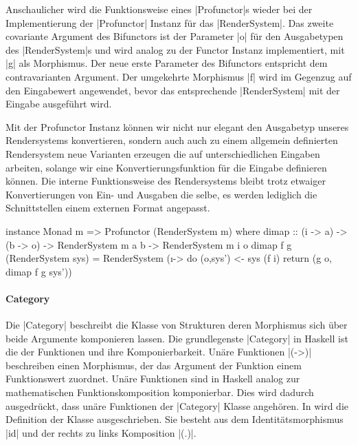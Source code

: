 Anschaulicher wird die Funktionsweise eines |Profunctor|s wieder bei der Implementierung der |Profunctor| Instanz für das |RenderSystem|. Das zweite covariante Argument des Bifunctors ist der Parameter |o| für den Ausgabetypen des |RenderSystem|s und wird analog zu der Functor Instanz implementiert, mit |g| als Morphismus. Der neue erste Parameter des Bifunctors entspricht dem contravarianten Argument. Der umgekehrte Morphismus |f| wird im Gegenzug auf den Eingabewert angewendet, bevor das entsprechende |RenderSystem| mit der Eingabe ausgeführt wird.

Mit der Profunctor Instanz können wir nicht nur elegant den Ausgabetyp unseres Rendersystems konvertieren, sondern auch auch zu einem allgemein definierten Rendersystem neue Varianten erzeugen die auf unterschiedlichen Eingaben arbeiten, solange wir eine Konvertierungsfunktion für die Eingabe definieren können. Die interne Funktionsweise des Rendersystems bleibt trotz etwaiger Konvertierungen von Ein- und Ausgaben die selbe, es werden lediglich die Schnittstellen einem externen Format angepasst.

\begin{haskell}[label={lst:rendersystem-profunctor},caption={Profunctor Instanz für RenderSystem}]
instance Monad m => Profunctor (RenderSystem m) where
  dimap :: (i -> a) -> (b -> o) -> RenderSystem m a b -> RenderSystem m i o
  dimap f g (RenderSystem sys) = RenderSystem (\i -> do
    (o,sys') <- sys (f i)
    return (g o, dimap f g sys'))
\end{haskell}



\paragraph{Category}

Die |Category| beschreibt die Klasse von Strukturen deren Morphismus sich über beide Argumente komponieren lassen. Die grundlegenste |Category| in Haskell ist die der Funktionen und ihre Komponierbarkeit. Unäre Funktionen |(->)| beschreiben einen Morphismus, der das Argument der Funktion einem Funktionswert zuordnet. Unäre Funktionen sind in Haskell analog zur mathematischen Funktionskomposition komponierbar. Dies wird dadurch ausgedrückt, dass unäre Funktionen der |Category| Klasse angehören. In  wird die Definition der Klasse ausgeschrieben. Sie besteht aus dem Identitätsmorphismus |id| und der rechts zu links Komposition |(.)|.

